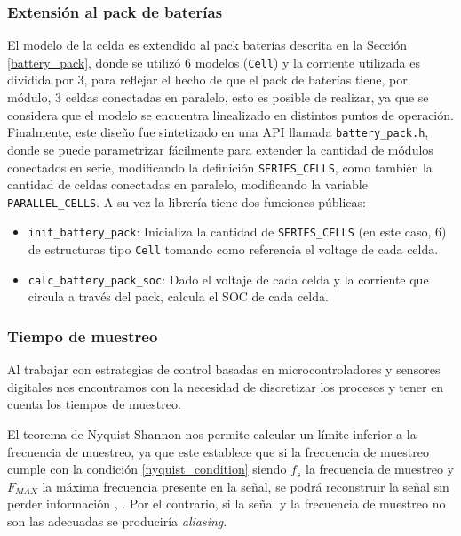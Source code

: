 \documentclass[10pt, a4paper]{report}
\begin{document}
\subsubsection{Extensi\'on al pack de bater\'ias}

El modelo de la celda es extendido al pack bater\'ias descrita en la Secci\'on
\ref{battery_pack}, donde se utiliz\'o 6 modelos (\texttt{Cell}) y la corriente
utilizada es dividida por 3, para reflejar el hecho de que el pack de bater\'ias 
tiene, por m\'odulo, 3 celdas conectadas en paralelo, esto es posible de 
realizar, ya que se considera que el modelo se encuentra linealizado en 
distintos puntos de operaci\'on. Finalmente, este diseño fue sintetizado en una
\acrshort{API} llamada \texttt{battery\_pack.h}, donde se puede parametrizar
f\'acilmente para extender la cantidad de m\'odulos conectados en serie, 
modificando la definici\'on \texttt{SERIES\_CELLS}, como tambi\'en la cantidad de
celdas conectadas en paralelo, modificando la variable \texttt{PARALLEL\_CELLS}. 
A su vez la librer\'ia tiene dos funciones p\'ublicas:

\begin{itemize}
    \item \texttt{init\_battery\_pack}: Inicializa la cantidad de
        \texttt{SERIES\_CELLS} (en este caso, 6) de estructuras tipo 
        \texttt{Cell} tomando como referencia el voltage de cada celda.
    \item \texttt{calc\_battery\_pack\_soc}: Dado el voltaje de cada celda y la
        corriente que circula a trav\'es del pack, calcula el \acrshort{SOC} de
        cada celda.
\end{itemize}

\subsubsection{Tiempo de muestreo}

Al trabajar con estrategias de control basadas en microcontroladores y sensores
digitales nos encontramos con la necesidad de discretizar los procesos y tener
en cuenta los tiempos de muestreo.

El teorema de Nyquist-Shannon nos permite calcular un límite inferior a la
frecuencia de muestreo, ya que este establece que si la frecuencia de muestreo
cumple con la condición \ref{nyquist_condition} siendo $f_s$ la frecuencia de
muestreo y $F_{MAX}$ la máxima frecuencia presente en la señal, se podrá
reconstruir la señal sin perder información \cite{Nyquist1928},
\cite{Shannon1949}.  Por el contrario, si la señal y la frecuencia de muestreo
no son las adecuadas se produciría \emph{aliasing}.
\end{document}
